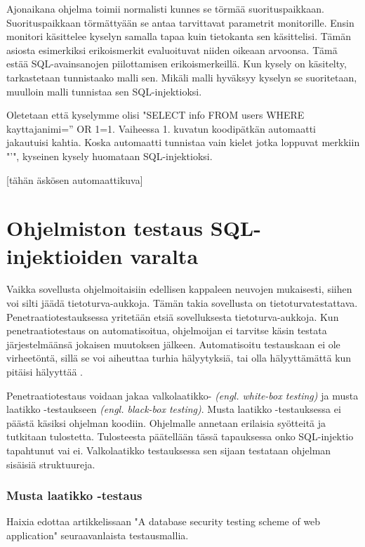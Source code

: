 \documentclass[finnish]{tktltiki2}
\theoremstyle{definition}
\theoremstyle{remark}
\begin{document}
\begin{enumerate}
		Ajonaikana ohjelma toimii normalisti kunnes se törmää suorituspaikkaan. Suorituspaikkaan törmättyään se antaa tarvittavat parametrit monitorille. Ensin monitori käsittelee kyselyn samalla tapaa kuin tietokanta sen käsittelisi. Tämän asiosta esimerkiksi erikoismerkit evaluoituvat niiden oikeaan arvoonsa. Tämä estää SQL-avainsanojen piilottamisen erikoismerkeillä. Kun kysely on käsitelty, tarkastetaan tunnistaako malli sen. Mikäli malli hyväksyy kyselyn se suoritetaan, muulloin malli tunnistaa sen SQL-injektioksi.
		
		Oletetaan että kyselymme olisi "SELECT info FROM users WHERE kayttajanimi='' OR 1=1. Vaiheessa 1. kuvatun koodipätkän automaatti jakautuisi kahtia. Koska automaatti tunnistaa vain kielet jotka loppuvat merkkiin "'", kyseinen kysely huomataan SQL-injektioksi.
		
		[tähän äskösen automaattikuva]
	\end{enumerate}
	
	\section{Ohjelmiston testaus SQL-injektioiden varalta}
	
	 Vaikka sovellusta ohjelmoitaisiin edellisen kappaleen neuvojen mukaisesti, siihen voi silti jäädä tietoturva-aukkoja. Tämän takia sovellusta on tietoturvatestattava. Penetraatiotestauksessa yritetään etsiä sovelluksesta tietoturva-aukkoja. Kun penetraatiotestaus on automatisoitua, ohjelmoijan ei tarvitse käsin testata järjestelmäänsä jokaisen muutoksen jälkeen. Automatisoitu testauskaan ei ole virheetöntä, sillä se voi aiheuttaa turhia hälyytyksiä, tai olla hälyyttämättä kun pitäisi hälyyttää \cite{virheita}. 
	
	 Penetraatiotestaus voidaan jakaa valkolaatikko- \textit{(engl. white-box testing)} ja musta laatikko -testaukseen \textit{(engl. black-box testing)}. Musta laatikko -testauksessa ei päästä käsiksi ohjelman koodiin. Ohjelmalle annetaan erilaisia syötteitä ja tutkitaan tulostetta. Tulosteesta päätellään tässä tapauksessa onko SQL-injektio tapahtunut vai ei. Valkolaatikko testauksessa sen sijaan testataan ohjelman sisäisiä struktuureja.
	
	\subsubsection{Musta laatikko -testaus}
	 Haixia edottaa artikkelissaan "A database security testing scheme of web application" \cite{testing} seuraavanlaista testausmallia.
	
\end{document}
